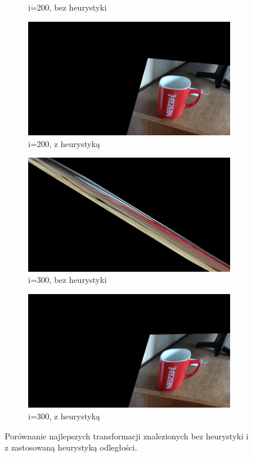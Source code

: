 \documentclass{article}
\begin{document}
\begin{figure}[H]
\begin{subfigure}[b]{0.35\linewidth}
			\caption{i=200, bez heurystyki}
		\end{subfigure}
		\begin{subfigure}[b]{0.35\linewidth}
			\includegraphics[width=\linewidth]{200t2.png}
			\caption{i=200, z heurystyką}
		\end{subfigure}
		\begin{subfigure}[b]{0.35\linewidth}
			\includegraphics[width=\linewidth]{300t1.png}
			\caption{i=300, bez heurystyki}
		\end{subfigure}
		\begin{subfigure}[b]{0.35\linewidth}
			\includegraphics[width=\linewidth]{300t2.png}
			\caption{i=300, z heurystyką}
		\end{subfigure}
		\caption{Porównanie najlepszych transformacji znalezionych bez heurystyki i z zastosowaną heurystyką odległości.}
		\label{fig:h2transform}
	\end{figure}
\end{document}
